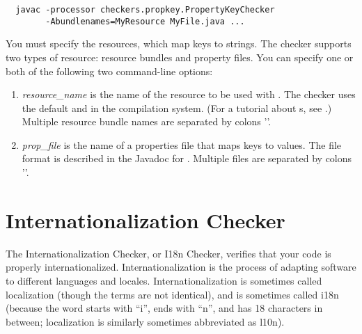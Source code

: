 \begin{Verbatim}
  javac -processor checkers.propkey.PropertyKeyChecker
        -Abundlenames=MyResource MyFile.java ...
\end{Verbatim}

You must specify the resources, which map keys to strings.
The checker supports two types of resource:
resource bundles and property files.  You can specify one or both of the
following two command-line options:

\begin{enumerate}

\item {}

  \emph{resource\_name} is the name of the resource to be used with
  .
  The checker uses the default  and  in the
  compilation system.
  (For a tutorial about s, see
  .)
  Multiple resource bundle names are separated by colons '\code{:}'.

\item {}

  \emph{prop\_file} is the name of a properties file that maps
  keys to values.  The file format is described in
  the Javadoc for 
  .
  Multiple files are separated by colons '\code{:}'.

\end{enumerate}



\section{Internationalization Checker\label{i18n-checker}}

The Internationalization Checker, or I18n Checker, verifies that your code is properly
internationalized.  Internationalization is the process of adapting
software to different languages and locales.  Internationalization is
sometimes called localization (though the terms are not
identical), and is sometimes called i18n (because the word starts with ``i'',
ends with ``n'', and has 18 characters in between; localization is similarly
sometimes abbreviated as l10n).

